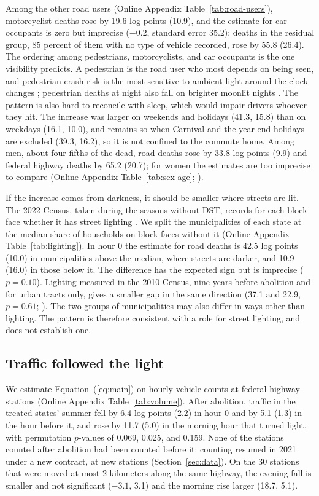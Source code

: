 Among the other road users (Online Appendix Table~\ref{tab:road-users}), motorcyclist deaths rose by 19.6 log points (10.9), and the estimate for car occupants is zero but imprecise ($-0.2$, standard error 35.2); deaths in the residual group, 85 percent of them with no type of vehicle recorded, rose by 55.8 (26.4). The ordering among pedestrians, motorcyclists, and car occupants is the one visibility predicts. A pedestrian is the road user who most depends on being seen, and pedestrian crash risk is the most sensitive to ambient light around the clock changes \citep{sullivan2002role, woods2025daylight}; pedestrian deaths at night also fall on brighter moonlit nights \citep{tyndall2025road}. The pattern is also hard to reconcile with sleep, which would impair drivers whoever they hit. The increase was larger on weekends and holidays (41.3, 15.8) than on weekdays (16.1, 10.0), and remains so when Carnival and the year-end holidays are excluded (39.3, 16.2), so it is not confined to the commute home. Among men, about four fifths of the dead, road deaths rose by 33.8 log points (9.9) and federal highway deaths by 65.2 (20.7); for women the estimates are too imprecise to compare (Online Appendix Table~\ref{tab:sex-age}; \citealp{prf2025pessoas}).

If the increase comes from darkness, it should be smaller where streets are lit. The 2022 Census, taken during the seasons without DST, records for each block face whether it has street lighting \citep{ibge2023censo}. We split the municipalities of each state at the median share of households on block faces without it (Online Appendix Table~\ref{tab:lighting}). In hour 0 the estimate for road deaths is 42.5 log points (10.0) in municipalities above the median, where streets are darker, and 10.9 (16.0) in those below it. The difference has the expected sign but is imprecise ($p=0.10$). Lighting measured in the 2010 Census, nine years before abolition and for urban tracts only, gives a smaller gap in the same direction (37.1 and 22.9, $p=0.61$; \citealp{ibge2011censo}). The two groups of municipalities may also differ in ways other than lighting. The pattern is therefore consistent with a role for street lighting, and does not establish one.

\subsection{Traffic followed the light}\label{sec:traffic}

We estimate Equation~(\ref{eq:main}) on hourly vehicle counts at federal highway stations (Online Appendix Table~\ref{tab:volume}). After abolition, traffic in the treated states' summer fell by 6.4 log points (2.2) in hour 0 and by 5.1 (1.3) in the hour before it, and rose by 11.7 (5.0) in the morning hour that turned light, with permutation $p$-values of 0.069, 0.025, and 0.159. None of the stations counted after abolition had been counted before it: counting resumed in 2021 under a new contract, at new stations (Section~\ref{sec:data}). On the 30 stations that were moved at most 2 kilometers along the same highway, the evening fall is smaller and not significant ($-3.1$, 3.1) and the morning rise larger (18.7, 5.1).

